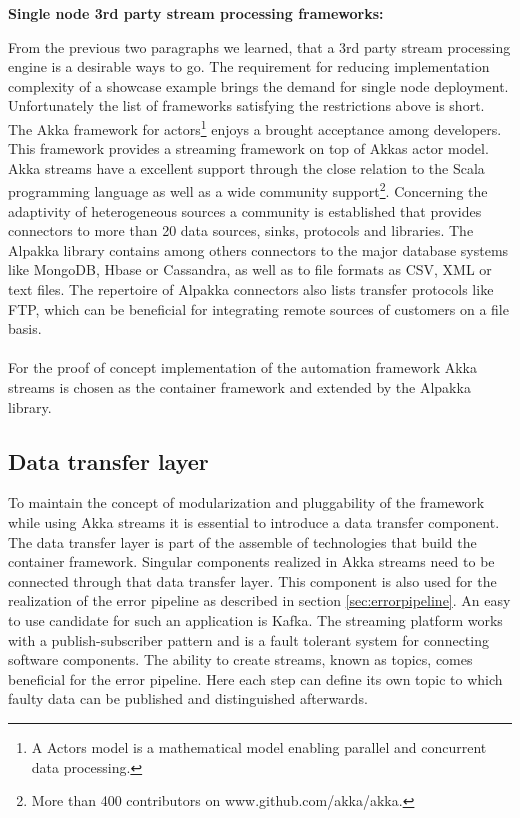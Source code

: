 \textbf{Single node 3rd party stream processing frameworks:}

\noindent From the previous two paragraphs we learned, that a 3rd party stream processing engine is a desirable ways to go. The requirement for reducing implementation complexity of a showcase example brings the demand for single node deployment. Unfortunately the list of frameworks satisfying the restrictions above is short. The Akka framework for actors\footnote{A Actors model is a mathematical model enabling parallel and concurrent data processing.}\cite{akka_2017} enjoys a brought acceptance among developers. This framework provides a streaming framework on top of Akkas actor model. Akka streams\cite{akka_streams_2017} have a excellent support through the close relation to the Scala programming language as well as a wide community support\footnote{More than 400 contributors on www.github.com/akka/akka.}. Concerning the adaptivity of heterogeneous sources a community is established that provides connectors to more than 20 data sources, sinks, protocols and libraries. The Alpakka library\cite{alpakka_2016} contains among others connectors to the major database systems like MongoDB, Hbase or Cassandra, as well as to file formats as CSV, XML or text files. The repertoire of Alpakka connectors also lists transfer protocols like FTP, which can be beneficial for integrating remote sources of customers on a file basis.
\\\\
For the proof of concept implementation of the automation framework Akka streams is chosen as the container framework and extended by the Alpakka library. 

\subsection{Data transfer layer}
To maintain the concept of modularization and pluggability of the framework while using Akka streams it is essential to introduce a data transfer component. The data transfer layer is part of the assemble of technologies that build the container framework. Singular components realized in Akka streams need to be connected through that data transfer layer. This component is also used for the realization of the error pipeline as described in section \ref{sec:errorpipeline}. An easy to use candidate for such an application is Kafka. The streaming platform works with a publish-subscriber pattern and is a fault tolerant system for connecting software components. The ability to create streams, known as topics, comes beneficial for the error pipeline. Here each step can define its own topic to which faulty data can be published and distinguished afterwards.

